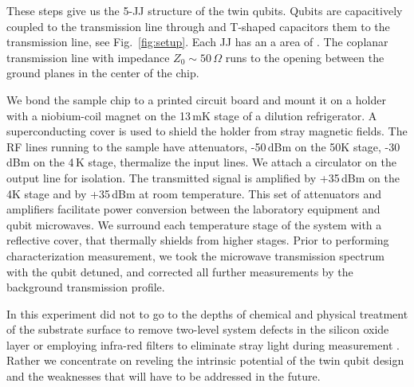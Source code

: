 These steps give us the 5-JJ structure of  the twin qubits. Qubits are capacitively coupled to
the  transmission line  through and  T-shaped capacitors  them to  the transmission  line, see
Fig.~\ref{fig:setup}.   Each  JJ has  an  a  area  of .   The  coplanar
transmission line  with impedance $  Z_{0} \sim 50\,\Omega  $ runs to  the opening between  the ground
planes in the center of the chip.


We  bond the  sample  chip  to a  printed  circuit board  and  mount it  on  a  holder with  a
niobium-coil magnet on  the 13\,mK stage of a dilution  refrigerator.  A superconducting cover
is used to  shield the holder from stray  magnetic fields. The RF lines running  to the sample
have attenuators, -50\,dBm on the 50K stage,  -30\,dBm on the 4\,K stage, thermalize the input
lines. We  attach a circulator  on the  output line for  isolation. The transmitted  signal is
amplified by  +35\,dBm on  the 4K  stage and  by +35\,dBm  at room  temperature.  This  set of
attenuators and  amplifiers facilitate power  conversion between the laboratory  equipment and
qubit microwaves.  We surround  each temperature stage of the system  with a reflective cover,
that thermally shields from higher  stages.  Prior to performing characterization measurement,
we took the microwave transmission spectrum with  the qubit detuned, and corrected all further
measurements by the background transmission profile.

In this  experiment did  not to go  to the depths  of chemical  and physical treatment  of the
substrate  surface   to  remove  two-level   system  defects   in  the  silicon   oxide  layer
\cite{earnest2018} or employing infra-red filters  to eliminate stray light during measurement
\cite{barends2011}. Rather  we concentrate  on reveling  the intrinsic  potential of  the twin
qubit design and the weaknesses that will have to be addressed in the future.

